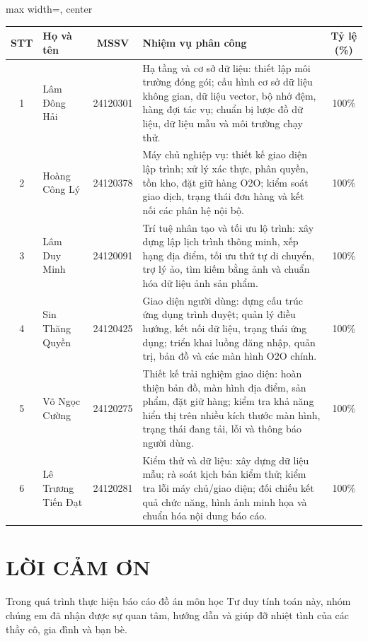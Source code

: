 \documentclass[12pt, a4paper]{article}
\begin{document}
\renewcommand{\arraystretch}{1.35}
\small
\begin{adjustbox}{max width=\textwidth, center}
\begin{tabular}{|c|l|c|p{8.2cm}|c|}
\hline
\textbf{STT} & \textbf{Họ và tên} & \textbf{MSSV} & \textbf{Nhiệm vụ phân công} & \textbf{Tỷ lệ (\%)} \\ \hline
1 & Lâm Đông Hải       & 24120301 & Hạ tầng và cơ sở dữ liệu: thiết lập môi trường đóng gói; cấu hình cơ sở dữ liệu không gian, dữ liệu vector, bộ nhớ đệm, hàng đợi tác vụ; chuẩn bị lược đồ dữ liệu, dữ liệu mẫu và môi trường chạy thử. & 100\% \\ \hline
2 & Hoàng Công Lý      & 24120378 & Máy chủ nghiệp vụ: thiết kế giao diện lập trình; xử lý xác thực, phân quyền, tồn kho, đặt giữ hàng O2O; kiểm soát giao dịch, trạng thái đơn hàng và kết nối các phân hệ nội bộ. & 100\% \\ \hline
3 & Lâm Duy Minh       & 24120091 & Trí tuệ nhân tạo và tối ưu lộ trình: xây dựng lập lịch trình thông minh, xếp hạng địa điểm, tối ưu thứ tự di chuyển, trợ lý ảo, tìm kiếm bằng ảnh và chuẩn hóa dữ liệu ảnh sản phẩm. & 100\% \\ \hline
4 & Sin Thăng Quyền    & 24120425 & Giao diện người dùng: dựng cấu trúc ứng dụng trình duyệt; quản lý điều hướng, kết nối dữ liệu, trạng thái ứng dụng; triển khai luồng đăng nhập, quản trị, bản đồ và các màn hình O2O chính. & 100\% \\ \hline
5 & Võ Ngọc Cường      & 24120275 & Thiết kế trải nghiệm giao diện: hoàn thiện bản đồ, màn hình địa điểm, sản phẩm, đặt giữ hàng; kiểm tra khả năng hiển thị trên nhiều kích thước màn hình, trạng thái đang tải, lỗi và thông báo người dùng. & 100\% \\ \hline
6 & Lê Trương Tiến Đạt & 24120281 & Kiểm thử và dữ liệu: xây dựng dữ liệu mẫu; rà soát kịch bản kiểm thử; kiểm tra lỗi máy chủ/giao diện; đối chiếu kết quả chức năng, hình ảnh minh họa và chuẩn hóa nội dung báo cáo. & 100\% \\ \hline
\end{tabular}
\end{adjustbox}
\normalsize
\vfill
\clearpage

\section*{LỜI CẢM ƠN}
Trong quá trình thực hiện báo cáo đồ án môn học Tư duy tính toán này, nhóm chúng em đã nhận được sự quan tâm, hướng dẫn và giúp đỡ nhiệt tình của các thầy cô, gia đình và bạn bè. 
\end{document}
